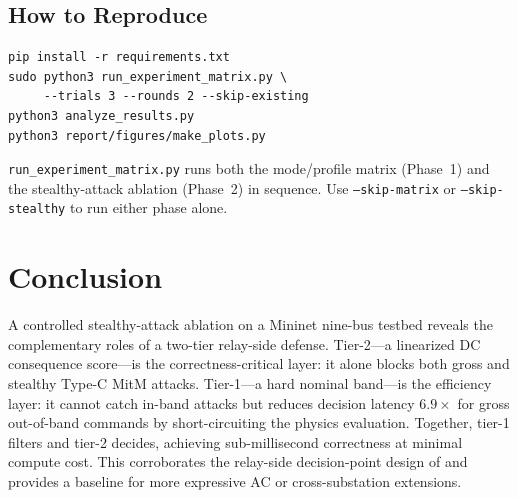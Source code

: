 \documentclass[conference]{IEEEtran}
\begin{document}
\subsection{How to Reproduce}
\begin{lstlisting}[style=shellbox]
pip install -r requirements.txt
sudo python3 run_experiment_matrix.py \
     --trials 3 --rounds 2 --skip-existing
python3 analyze_results.py
python3 report/figures/make_plots.py
\end{lstlisting}
\texttt{run\_experiment\_matrix.py} runs both the mode/profile matrix (Phase~1) and the stealthy-attack ablation (Phase~2) in sequence. Use \texttt{--skip-matrix} or \texttt{--skip-stealthy} to run either phase alone.

\section{Conclusion}\label{sec:conclusion}
A controlled stealthy-attack ablation on a Mininet nine-bus testbed reveals the complementary roles of a two-tier relay-side defense. Tier-2---a linearized DC consequence score---is the correctness-critical layer: it alone blocks both gross and stealthy Type-C MitM attacks. Tier-1---a hard nominal band---is the efficiency layer: it cannot catch in-band attacks but reduces decision latency $6.9\times$ for gross out-of-band commands by short-circuiting the physics evaluation. Together, tier-1 filters and tier-2 decides, achieving sub-millisecond correctness at minimal compute cost. This corroborates the relay-side decision-point design of \cite{linSafetycriticalCyberphysicalAttacks2016} and provides a baseline for more expressive AC or cross-substation extensions.



\end{document}
